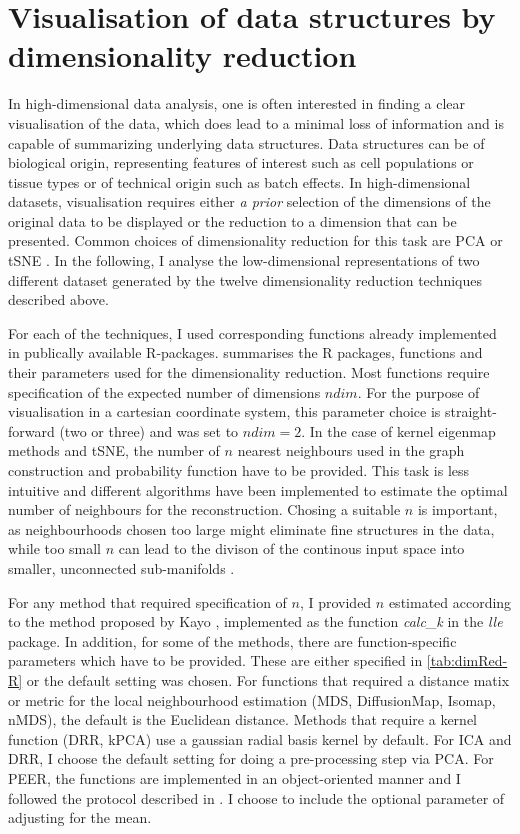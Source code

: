 \section{Visualisation of data structures by dimensionality reduction}
\label{section:visualisation}
In high-dimensional data analysis, one is often interested in finding a clear visualisation of the data, which does lead to a minimal loss of information and is capable of summarizing underlying data structures. Data structures can be of biological origin, representing features of interest such as cell populations or tissue types or of technical origin such as batch effects. In high-dimensional datasets, visualisation requires either \textit{a prior} selection of the dimensions of the original data to be displayed or the reduction to a dimension that can be presented. Common choices of dimensionality reduction for this task are PCA or tSNE \citep{Deng2014,Crowley2015,Corces2016,Martinez-Jimenez2017,Huisman2017}. In the following, I analyse the low-dimensional representations of two different dataset generated by the twelve dimensionality reduction techniques described above.

For each of the techniques, I used corresponding functions already implemented in publically available R-packages.  summarises the R packages, functions and their parameters used for the dimensionality reduction. Most functions require specification of the expected number of dimensions \(ndim\). For the purpose of visualisation in a cartesian coordinate system, this parameter choice is straight-forward (two or three) and was set to  \(ndim=2\). In the case of kernel eigenmap methods and tSNE, the number of \(n\) nearest neighbours used in the graph construction and probability function have to be provided. This task is less intuitive and different algorithms have been implemented to estimate the optimal number of neighbours for the reconstruction. Chosing a suitable \(n\) is important, as neighbourhoods chosen too large might eliminate fine structures in the data, while too small \(n\) can lead to the divison of the continous input space into smaller, unconnected sub-manifolds \citep{Kayo2006}.

For any method that required specification of \(n\), I provided \(n\) estimated according to the method proposed by Kayo \citep{Kayo2006}, implemented as the function \textit{calc}\_\textit{k} in the \textit{lle} package. In addition, for some of the methods, there are function-specific parameters which have to be provided. These are either specified in \cref{tab:dimRed-R} or the default setting was chosen. For functions that required a distance matix or metric for the local neighbourhood estimation (MDS, DiffusionMap, Isomap, nMDS), the default is the Euclidean distance. Methods that require a kernel function (DRR, kPCA) use a gaussian radial basis kernel by default. For ICA and DRR, I choose the default setting for doing a pre-processing step via PCA. For PEER, the functions are implemented in an object-oriented manner and I followed the protocol described in \citep{Stegle2012}. I choose to include the optional parameter of adjusting for the mean.  

